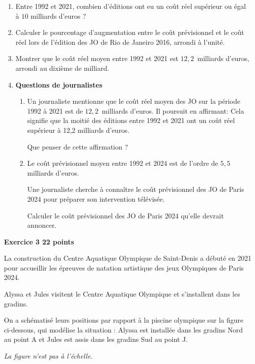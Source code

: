 \documentclass[11pt]{article}
\begin{document}
\medskip

\begin{enumerate}
\item Entre 1992 et 2021, combien d'éditions ont eu un coût réel supérieur ou égal à $10$ milliards d'euros ?
\item Calculer le pourcentage d'augmentation entre le coût prévisionnel et le coût réel lors de l'édition des JO de Rio de Janeiro 2016, arrondi à l'unité.
\item Montrer que le coût réel moyen entre 1992 et 2021 est $12,2$~milliards d'euros, arrondi au dixième de milliard.
\item \textbf{Questions de journalistes}
	\begin{enumerate}
		\item Un journaliste mentionne que le coût réel moyen des JO sur la période 1992 à 2021 est de $12,2$~milliards d'euros. Il poursuit en affirmant: \og Cela signifie que la moitié des éditions entre 1992 et 2021 ont un coût réel supérieur à 12,2 milliards d'euros. \fg
		
Que penser de cette affirmation ?
		\item Le coût prévisionnel moyen entre 1992 et 2024 est de l'ordre de $5,5$ milliards d'euros.
		
Une journaliste cherche à connaître le coût prévisionnel des JO de Paris 2024 pour préparer son intervention télévisée.
		
Calculer le coût prévisionnel des JO de Paris 2024 qu'elle devrait annoncer.
	\end{enumerate}
\end{enumerate}

\bigskip

\textbf{\large{}Exercice 3 \hfill 22 points}

\medskip

La construction du Centre Aquatique Olympique de Saint-Denis a débuté en 2021 pour accueillir les épreuves de natation artistique des jeux Olympiques de Paris 2024.

Alyssa et Jules visitent le Centre Aquatique Olympique et s'installent dans les gradins.

On a schématisé leurs positions par rapport à la piscine olympique sur la figure ci-dessous, qui modélise la situation : Alyssa est installée dans les gradins Nord au point A et Jules est assis dans les gradins Sud au point J.

\emph{La figure n'est pas à l'échelle.}
\end{document}
